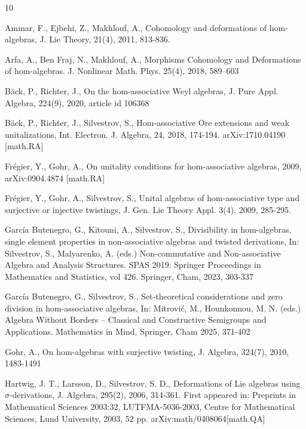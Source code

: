 \documentclass[12pt]{article}
\begin{document}
		\begin{thebibliography}{10}
			
			 Ammar, F., Ejbehi, Z., Makhlouf, A., Cohomology and deformations of hom-
			algebras, J. Lie Theory, 21(4), 2011, 813-836.
			
			 Arfa, A., Ben Fraj,  N., Makhlouf, A.,  Morphisms Cohomology and Deformations of hom-algebras. J. Nonlinear Math. Phys. 25(4), 2018, 589–603
			
			B\"{a}ck, P., Richter, J., On the hom-associative Weyl algebras, J. Pure Appl. Algebra,  224(9), 2020, article id 106368
			
			B\"{a}ck, P., Richter, J., Silvestrov, S., Hom-associative Ore extensions and weak unitalizations, Int. Electron. J. Algebra, 24, 2018,  174-194.	arXiv:1710.04190 [math.RA]
			
			 Fr\'{e}gier, Y., Gohr, A., On unitality conditions for hom-associative algebras, 2009, arXiv:0904.4874 [math.RA]
			
			Fr\'{e}gier, Y., Gohr, A., Silvestrov, S., Unital algebras of hom-associative type and surjective or injective twistings,  J. Gen. Lie Theory Appl. 3(4), 2009, 285-295.
			
			Garc\'{i}a Butenegro, G., Kitouni, A., Silvestrov, S., Divisibility in hom-algebras, single element properties in non-associative algebras and twisted derivations, In: Silvestrov, S., Malyarenko, A. (eds.)
            Non-commutative and Non-associative Algebra and Analysis Structures. SPAS 2019. Springer Proceedings in Mathematics and Statistics, vol 426. Springer, Cham, 2023, 303-337
			
			Garc\'{i}a Butenegro, G., Silvestrov, S., Set-theoretical considerations and zero division in hom-associative algebras, In: Mitrovi\'{c}, M., Hounkonnou, M. N. (eds.) Algebra Without Borders -- Classical and Constructive Semigroups and Applications. Mathematics in Mind, Springer, Cham 2025, 371-402
			
			  Gohr, A., On hom-algebras with surjective twisting, J. Algebra, 324(7), 2010, 1483-1491
			
			  Hartwig, J. T., Larsson, D., Silvestrov, S. D.,
			Deformations of Lie algebras using $\sigma$-derivations, J. Algebra, {295}(2),  2006, 314-361. First appeared in: Preprints in Mathematical Sciences 2003:32, LUTFMA-5036-2003, Centre for Mathematical Sciences, Lund University, 2003, 52 pp. arXiv:math/0408064[math.QA]
			

\end{thebibliography}
\end{document}
